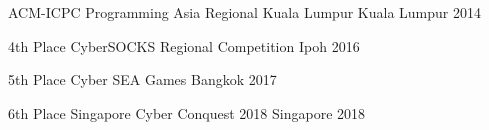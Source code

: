 



\begin{cvhonors}

  \cvhonor
    {}
    {ACM-ICPC Programming Asia Regional Kuala Lumpur} 
    {Kuala Lumpur} 
    {2014} 

  \cvhonor
    {4th Place} 
    {CyberSOCKS Regional Competition} 
    {Ipoh} 
    {2016} 

  \cvhonor
    {5th Place} 
    {Cyber SEA Games} 
    {Bangkok} 
    {2017} 

  \cvhonor
    {6th Place} 
    {Singapore Cyber Conquest 2018} 
    {Singapore} 
    {2018} 

\end{cvhonors}




